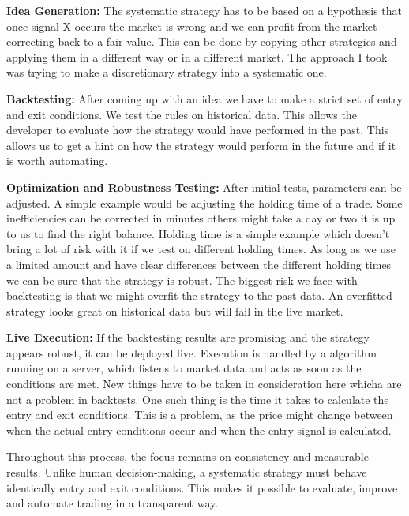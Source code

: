 \documentclass[12pt]{article}
\begin{document}
\textbf{Idea Generation:}
The systematic strategy has to be based on a hypothesis that once signal X occurs the market is wrong and we can profit from the market correcting back to a fair value. This can be done by copying other strategies and applying them in a different way or in a different market. The approach I took was trying to make a discretionary strategy into a systematic one.



\textbf{Backtesting:}
After coming up with an idea we have to make a strict set of entry and exit conditions. We test the rules on historical data. This allows the developer to evaluate how the strategy would have performed in the past. This allows us to get a hint on how the strategy would perform in the future and if it is worth automating. 

\textbf{Optimization and Robustness Testing:}
After initial tests, parameters can be adjusted. A simple example would be adjusting the holding time of a trade.  Some inefficiencies can be corrected in minutes others might take a day or two it is up to us to find the right balance. Holding time is a simple example which doesn't bring a lot of risk with it if we test on different holding times. As long as we use a limited amount and have clear differences between the different holding times we can be sure that the strategy is robust. The biggest risk we face with backtesting is that we might overfit the strategy to the past data. An overfitted strategy looks great on historical data but will fail in the live market.

\textbf{Live Execution:}
If the backtesting results are promising and the strategy appears robust, it can be deployed live. Execution is handled by a algorithm running on a server, which listens to market data and acts as soon as the conditions are met. New things have to be taken in consideration here whicha are not a problem in backtests. One such thing is the time it takes to calculate the entry and exit conditions. This is a problem, as the price might change between when the actual entry conditions occur and when the entry signal is calculated.

Throughout this process, the focus remains on consistency and measurable results. Unlike human decision-making, a systematic strategy must behave identically entry and exit conditions. This makes it possible to evaluate, improve and automate trading in a transparent way.
\end{document}

